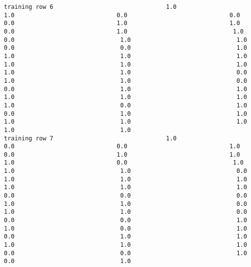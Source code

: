 \documentclass[11pt]{article}
\begin{document}
\begin{verbatim}
training row 6                                1.0                             1.0                             0.0                             0.0                             0.0                             1.0                             1.0                             0.0                             1.0                              1.0                              0.0                              1.0                              1.0                              0.0                              0.0                              1.0                              1.0                              1.0                              1.0                              1.0                              1.0                              1.0                              1.0                              1.0                              0.0                              1.0                              1.0                              0.0                              0.0                              1.0                              1.0                              1.0                              1.0                              1.0                              1.0                              0.0                              1.0                              0.0                              1.0                              1.0                              1.0                              1.0                              1.0                              1.0                              1.0
training row 7                                1.0                             0.0                             0.0                             1.0                             0.0                             1.0                             1.0                             1.0                             0.0                              1.0                              1.0                              1.0                              0.0                              1.0                              1.0                              1.0                              1.0                              1.0                              1.0                              0.0                              0.0                              0.0                              1.0                              1.0                              0.0                              1.0                              1.0                              0.0                              0.0                              0.0                              1.0                              1.0                              0.0                              1.0                              0.0                              1.0                              1.0                              1.0                              1.0                              1.0                              0.0                              0.0                              1.0                              0.0                              1.0

\end{verbatim}
\end{document}
